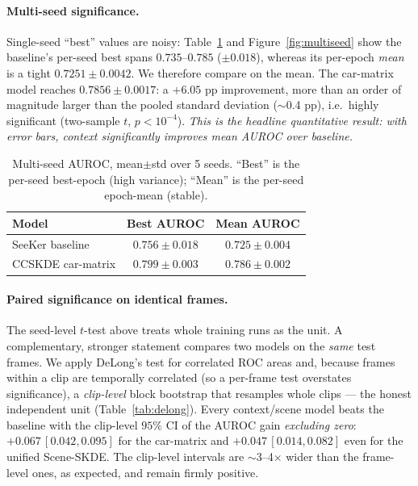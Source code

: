 \documentclass{article}
\begin{document}
\paragraph{Multi-seed significance.} Single-seed ``best'' values are noisy:
Table~\ref{tab:multiseed} and Figure~\ref{fig:multiseed} show the baseline's
per-seed best spans $0.735$--$0.785$ ($\pm0.018$), whereas its per-epoch
\emph{mean} is a tight $0.7251\pm0.0042$. We therefore compare on the mean. The
car-matrix model reaches $0.7856\pm0.0017$: a $+6.05$ pp improvement, more than an
order of magnitude larger than the pooled standard deviation ($\sim$0.4 pp), i.e.\
highly significant (two-sample $t$, $p<10^{-4}$). \emph{This is the headline
quantitative result: with error bars, context significantly improves mean AUROC
over baseline.}

\begin{table}[t]
\centering
\caption{Multi-seed AUROC, mean$\pm$std over 5 seeds. ``Best'' is the per-seed
best-epoch (high variance); ``Mean'' is the per-seed epoch-mean (stable).}
\label{tab:multiseed}
\begin{tabular}{lcc}
\toprule
Model & Best AUROC & Mean AUROC \\
\midrule
SeeKer baseline & $0.756 \pm 0.018$ & $0.725 \pm 0.004$ \\
CCSKDE car-matrix & $0.799 \pm 0.003$ & $\mathbf{0.786 \pm 0.002}$ \\
\bottomrule
\end{tabular}
\end{table}

\paragraph{Paired significance on identical frames.} The seed-level $t$-test
above treats whole training runs as the unit. A complementary, stronger statement
compares two models on the \emph{same} test frames. We apply DeLong's test for
correlated ROC areas and, because frames within a clip are temporally correlated
(so a per-frame test overstates significance), a \emph{clip-level} block
bootstrap that resamples whole clips --- the honest independent unit
(Table~\ref{tab:delong}). Every context/scene model beats the baseline with the
clip-level $95\%$ CI of the AUROC gain \emph{excluding zero}: $+0.067\,
[0.042,0.095]$ for the car-matrix and $+0.047\,[0.014,0.082]$ even for the
unified Scene-SKDE. The clip-level intervals are $\sim$3--4$\times$ wider than the
frame-level ones, as expected, and remain firmly positive.
\end{document}

